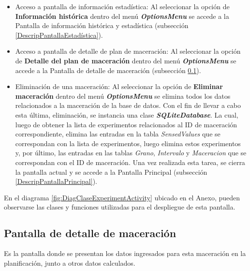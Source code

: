 \begin{itemize}
                    \item Acceso a pantalla de información estadística: Al seleccionar la opción de \textbf{Información histórica} dentro del menú \textbf{\textit{\gls{OptionsMenu}}} se accede a la Pantalla de información histórica y estadística (subsección \ref{DescripPantallaEstadística}).
                    
                    \item Acceso a pantalla de detalle de plan de maceración: Al seleccionar la opción de \textbf{Detalle del plan de maceración} dentro del menú \textbf{\textit{\gls{OptionsMenu}}} se accede a la Pantalla de detalle de maceración (subsección \ref{DescripPantallaDetalleMaceración}).
                    
                    \item Eliminación de una maceración:  Al seleccionar la opción de \textbf{ Eliminar maceración} dentro del menú \textbf{\textit{\gls{OptionsMenu}}} se elimina todos los datos relacionados a la maceración de la base de datos. Con el fin de llevar a cabo esta última, eliminación, se instancia una clase \textbf{\textit{\gls{SQLiteDatabase}}}. La cual, luego de obtener la lista de experimentos relacionados al ID de maceración correspondiente, elimina las entradas en la tabla \textit{SensedValues} que se correspondan con la lista de experimentos, luego elimina estos experimentos y, por último, las entradas en las tablas \textit{Grano}, \textit{Intervalo} y \textit{Maceracion} que se correspondan con el ID de maceración. Una vez realizada esta tarea, se cierra la pantalla actual y se accede a la Pantalla Principal (subsección \ref{DescripPantallaPrincipal}).
                   
                \end{itemize}
                
                
                \par En el diagrama \ref{fig:DiagClaseExperimentActivity} ubicado en el Anexo, pueden observarse las clases y funciones utilizadas para el despliegue de esta pantalla.
            
        \subsection{Pantalla de detalle de maceración}
        \label{DescripPantallaDetalleMaceración}
            \par Es la pantalla donde se presentan los datos ingresados para esta maceración en la planificación, junto a otros datos calculados.
            
